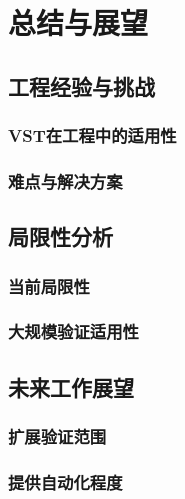 \chapter{总结与展望}
\section{工程经验与挑战}
\subsection{VST在工程中的适用性}
\subsection{难点与解决方案}
\section{局限性分析}
\subsection{当前局限性}
\subsection{大规模验证适用性}
\section{未来工作展望}
\subsection{扩展验证范围}
\subsection{提供自动化程度}
